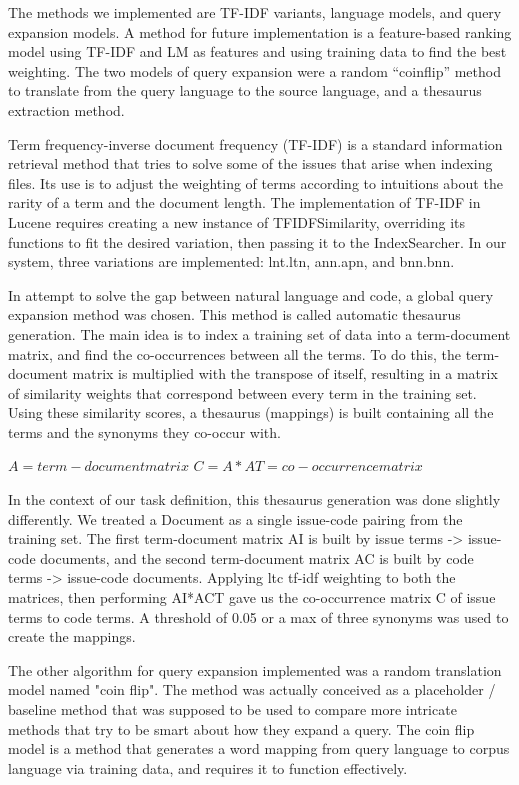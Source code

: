 \documentclass[10pt,a4paper]{article}
\begin{document}
The methods we implemented are TF-IDF variants, language models, and query expansion models. A method for future implementation is a feature-based ranking model using TF-IDF and LM as features and using training data to find the best weighting. The two models of query expansion were a random “coinflip” method to translate from the query language to the source language, and a thesaurus extraction method.
  
Term frequency-inverse document frequency (TF-IDF) is a standard information retrieval method that tries to solve some of the issues that arise when indexing files. Its use is to adjust the weighting of terms according to intuitions about the rarity of a term and the document length. The implementation of TF-IDF in Lucene requires creating a new instance of TFIDFSimilarity, overriding its functions to fit the desired variation, then passing it to the IndexSearcher. In our system, three variations are implemented: lnt.ltn, ann.apn, and bnn.bnn.

In attempt to solve the gap between natural language and code, a global query expansion method was chosen. This method is called automatic thesaurus generation. The main idea is to index a training set of data into a term-document matrix, and find the co-occurrences between all the terms. To do this, the term-document matrix is multiplied with the transpose of itself, resulting in a matrix of similarity weights that correspond between every term in the training set. Using these similarity scores, a thesaurus (mappings) is built containing all the terms and the synonyms they co-occur with. 

    $A = term-document matrix$
    $C = A*AT = co-occurrence matrix$

In the context of our task definition, this thesaurus generation was done slightly differently. We treated a Document as a single issue-code pairing from the training set. The first term-document matrix AI is built by issue terms -> issue-code documents, and the second term-document matrix AC is built by code terms -> issue-code documents. Applying ltc tf-idf weighting to both the matrices, then performing AI*ACT gave us the co-occurrence matrix C of issue terms to code terms. A threshold of 0.05 or a max of three synonyms was used to create the mappings.

The other algorithm for query expansion implemented was a random translation model named
"coin flip". The method was actually conceived as a placeholder / baseline method that was supposed
to be used to compare more intricate methods that try to be smart about how they
expand a query. The coin flip model is a method that generates a word mapping
from query language to corpus language via training data, and requires it to function
effectively.
\end{document}
